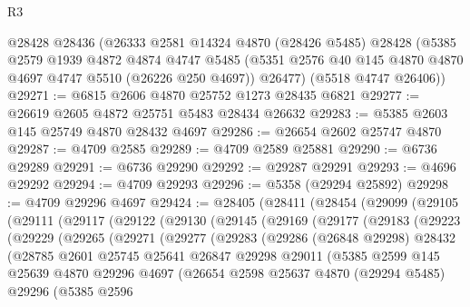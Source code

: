 \begin{lexlean}{R3}
\begin{coremodule}
    @28428
    @28436
    (@26333
      @2581
      @14324
      @4870
      (@28426 @5485)
      @28428
      (@5385
        @2579
        @1939
        @4872
        @4874
        @4747
        @5485
        (@5351 @2576 @40 @145 @4870 @4870 @4697 @4747 @5510 (@26226 @250 @4697))
        @26477)
      (@5518 @4747 @26406))
@29271 := @6815 @2606 @4870 @25752 @1273 @28435 @6821
@29277 := @26619 @2605 @4872 @25751 @5483 @28434 @26632
@29283 := @5385 @2603 @145 @25749 @4870 @28432 @4697
@29286 := @26654 @2602 @25747 @4870
@29287 := @4709 @2585
@29289 := @4709 @2589 @25881
@29290 := @6736 @29289
@29291 := @6736 @29290
@29292 := @29287 @29291
@29293 := @4696 @29292
@29294 := @4709 @29293
@29296 := @5358 (@29294 @25892)
@29298 := @4709 @29296 @4697
@29424 := @28405
    (@28411
      (@28454
        (@29099
          (@29105
            (@29111
              (@29117
                (@29122
                  (@29130
                    (@29145
                      (@29169
                        (@29177
                          (@29183
                            (@29223
                              (@29229
                                (@29265
                                  (@29271
                                    (@29277
                                      (@29283
                                        (@29286
                                          (@26848 @29298)
                                          @28432
                                          (@28785
                                            @2601
                                            @25745
                                            @25641
                                            @26847
                                            @29298
                                            @29011
                                            (@5385
                                              @2599
                                              @145
                                              @25639
                                              @4870
                                              @29296
                                              @4697
                                              (@26654
                                                @2598
                                                @25637
                                                @4870
                                                (@29294 @5485)
                                                @29296
                                                (@5385
                                                  @2596

\end{coremodule}
\end{lexlean}
